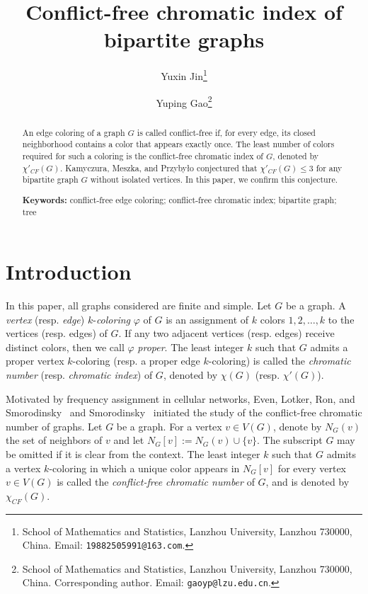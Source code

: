 \documentclass[11pt]{article}
\theoremstyle{plain}
\numberwithin{equation}{section}
\begin{document}
\title{Conflict-free chromatic index of bipartite graphs}


\author{Yuxin Jin\footnote{School of Mathematics and Statistics, Lanzhou University, Lanzhou 730000, China.
		Email: {\tt 19882505991@163.com}. }
\and
Yuping Gao\footnote{School of Mathematics and Statistics, Lanzhou University, Lanzhou 730000, China.
		Corresponding author.
		Email: {\tt gaoyp@lzu.edu.cn}.
		}
}

	\date{}
\maketitle


\begin{abstract}
An edge coloring of a graph $G$ is called conflict-free if, for every edge, its closed neighborhood contains a color that appears exactly once. The least number of colors required for such a coloring is the conflict-free chromatic index of $G$, denoted by $\chi'_{CF}(G)$. Kamyczura, Meszka, and Przyby{\l}o conjectured that $\chi'_{CF}(G)\le 3$ for any bipartite graph $G$ without isolated vertices. In this paper, we confirm this conjecture.

\noindent\textbf{Keywords:} conflict-free edge coloring; conflict-free chromatic index; bipartite graph; tree
\end{abstract}

\section{Introduction}\label{sec:introduction}

In this paper, all graphs considered are finite and simple. Let $G$ be a graph. A \emph{vertex} (resp. \emph{edge}) $k$-\emph{coloring} $\varphi$ of $G$ is an assignment of $k$ colors $1,2,\ldots,k$ to the vertices (resp. edges) of $G$. If any two adjacent vertices (resp. edges) receive distinct colors, then we call $\varphi$ \emph{proper}. The least integer $k$ such that $G$ admits a proper vertex $k$-coloring (resp. a proper edge $k$-coloring) is called the \emph{chromatic number} (resp. \emph{chromatic index}) of $G$, denoted by $\chi(G)$ (resp. $\chi'(G)$).

Motivated by frequency assignment in cellular networks, Even, Lotker, Ron, and Smorodinsky~\cite{EvenLotkerRonSmorodinsky2003} and Smorodinsky~\cite{S2003} initiated the study of the conflict-free chromatic number of graphs. Let $G$ be a graph. For a vertex $v\in V(G)$, denote by $N_G(v)$ the set of neighbors of $v$ and let $N_G[v]:=N_G(v)\cup\{v\}$. The subscript $G$ may be omitted if it is clear from the context. The least integer $k$ such that $G$ admits a vertex $k$-coloring in which a unique color appears in $N_G[v]$ for every vertex $v\in V(G)$ is called the \emph{conflict-free chromatic number} of $G$, and is denoted by $\chi_{CF}(G)$.
\end{document}
